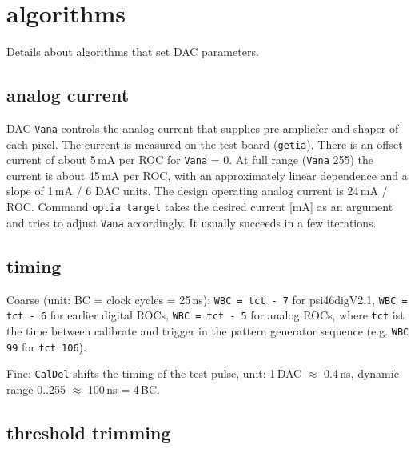 \documentclass[english]{article}
\begin{document}
\section{algorithms}

Details about algorithms that set DAC parameters.


\subsection{analog current}

DAC \texttt{Vana} controls the analog current that supplies pre-ampliefer
and shaper of each pixel. The current is measured on the test board
(\texttt{getia}). There is an offset current of about 5\,mA per ROC
for \texttt{Vana} = 0. At full range (\texttt{Vana} 255) the current
is about 45\,mA per ROC, with an approximately linear dependence
and a slope of 1\,mA / 6 DAC units. The design operating analog current
is 24\,mA / ROC. Command \texttt{optia target} takes the desired
current {[}mA{]} as an argument and tries to adjust \texttt{Vana}
accordingly. It usually succeeds in a few iterations.


\subsection{timing}

Coarse (unit: BC = clock cycles = 25\,ns): \texttt{WBC = tct\,-\,7}
for psi46digV2.1, \texttt{WBC = tct\,-\,6} for earlier digital ROCs,
\texttt{WBC = tct\,-\,5} for analog ROCs, where \texttt{tct} ist
the time between calibrate and trigger in the pattern generator sequence
(e.g. \texttt{WBC 99} for \texttt{tct 106}).

Fine: \texttt{CalDel} shifts the timing of the test pulse, unit: 1\,DAC
\ensuremath{\approx} 0.4\,ns, dynamic range 0..255 \ensuremath{\approx}
100\,ns = 4\,BC.


\subsection{threshold trimming}
\end{document}
